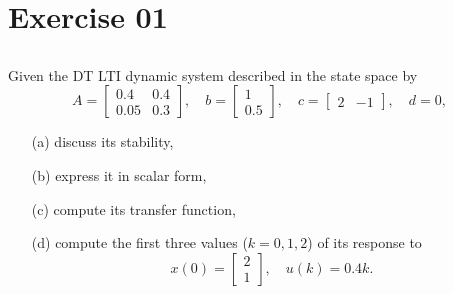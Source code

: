 \section{Exercise 01}
\subsection{}

\begin{frame}
\myPause
 Given the DT LTI dynamic system described in the state space by
 \begin{displaymath}
  A = \begin{bmatrix} 0.4 & 0.4 \\ 0.05 & 0.3 \end{bmatrix}, \quad
  b = \begin{bmatrix} 1 \\ 0.5 \end{bmatrix}, \quad
  c = \begin{bmatrix} 2 & -1 \end{bmatrix}, \quad
  d = 0,
 \end{displaymath}
 \begin{itemize}[<+-| alert@+>]
 \item[(a)] discuss its stability,
 \item[(b)] express it in scalar form,
 \item[(c)] compute its transfer function,
 \item[(d)] compute the first three values ($k=0,1,2$) of its response to
            \begin{displaymath}
             x(0) = \begin{bmatrix} 2 \\ 1 \end{bmatrix}, \quad
             u(k) = 0.4k.
            \end{displaymath}
 \end{itemize}
\end{frame}

